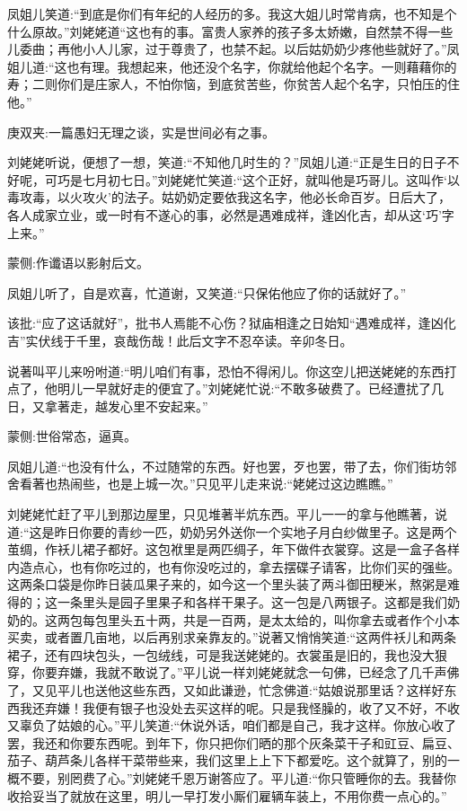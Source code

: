 \begin{parag}
    凤姐儿笑道:“到底是你们有年纪的人经历的多。我这大姐儿时常肯病，也不知是个什么原故。”刘姥姥道“这也有的事。富贵人家养的孩子多太娇嫩，自然禁不得一些儿委曲；再他小人儿家，过于尊贵了，也禁不起。以后姑奶奶少疼他些就好了。”凤姐儿道:“这也有理。我想起来，他还没个名字，你就给他起个名字。一则藉藉你的寿；二则你们是庄家人，不怕你恼，到底贫苦些，你贫苦人起个名字，只怕压的住他。”\begin{note}庚双夹:一篇愚妇无理之谈，实是世间必有之事。\end{note}刘姥姥听说，便想了一想，笑道:“不知他几时生的？”凤姐儿道:“正是生日的日子不好呢，可巧是七月初七日。”刘姥姥忙笑道:“这个正好，就叫他是巧哥儿。这叫作‘以毒攻毒，以火攻火’的法子。姑奶奶定要依我这名字，他必长命百岁。日后大了，各人成家立业，或一时有不遂心的事，必然是遇难成祥，逢凶化吉，却从这‘巧’字上来。”\begin{note}蒙侧:作谶语以影射后文。\end{note}
\end{parag}


\begin{parag}
    凤姐儿听了，自是欢喜，忙道谢，又笑道:“只保佑他应了你的话就好了。”\begin{note} 该批:“应了这话就好”，批书人焉能不心伤？狱庙相逢之日始知“遇难成祥，逢凶化吉”实伏线于千里，哀哉伤哉！此后文字不忍卒读。辛卯冬日。\end{note}说著叫平儿来吩咐道:“明儿咱们有事，恐怕不得闲儿。你这空儿把送姥姥的东西打点了，他明儿一早就好走的便宜了。”刘姥姥忙说:“不敢多破费了。已经遭扰了几日，又拿著走，越发心里不安起来。”\begin{note}蒙侧:世俗常态，逼真。\end{note}凤姐儿道:“也没有什么，不过随常的东西。好也罢，歹也罢，带了去，你们街坊邻舍看著也热闹些，也是上城一次。”只见平儿走来说:“姥姥过这边瞧瞧。”
\end{parag}


\begin{parag}
    刘姥姥忙赶了平儿到那边屋里，只见堆著半炕东西。平儿一一的拿与他瞧著，说道:“这是昨日你要的青纱一匹，奶奶另外送你一个实地子月白纱做里子。这是两个茧绸，作袄儿裙子都好。这包袱里是两匹绸子，年下做件衣裳穿。这是一盒子各样内造点心，也有你吃过的，也有你没吃过的，拿去摆碟子请客，比你们买的强些。这两条口袋是你昨日装瓜果子来的，如今这一个里头装了两斗御田粳米，熬粥是难得的；这一条里头是园子里果子和各样干果子。这一包是八两银子。这都是我们奶奶的。这两包每包里头五十两，共是一百两，是太太给的，叫你拿去或者作个小本买卖，或者置几亩地，以后再别求亲靠友的。”说著又悄悄笑道:“这两件袄儿和两条裙子，还有四块包头，一包绒线，可是我送姥姥的。衣裳虽是旧的，我也没大狠穿，你要弃嫌，我就不敢说了。”平儿说一样刘姥姥就念一句佛，已经念了几千声佛了，又见平儿也送他这些东西，又如此谦逊，忙念佛道:“姑娘说那里话？这样好东西我还弃嫌！我便有银子也没处去买这样的呢。只是我怪臊的，收了又不好，不收又辜负了姑娘的心。”平儿笑道:“休说外话，咱们都是自己，我才这样。你放心收了罢，我还和你要东西呢。到年下，你只把你们晒的那个灰条菜干子和豇豆、扁豆、茄子、葫芦条儿各样干菜带些来，我们这里上上下下都爱吃。这个就算了，别的一概不要，别罔费了心。”刘姥姥千恩万谢答应了。平儿道:“你只管睡你的去。我替你收拾妥当了就放在这里，明儿一早打发小厮们雇辆车装上，不用你费一点心的。”
\end{parag}


